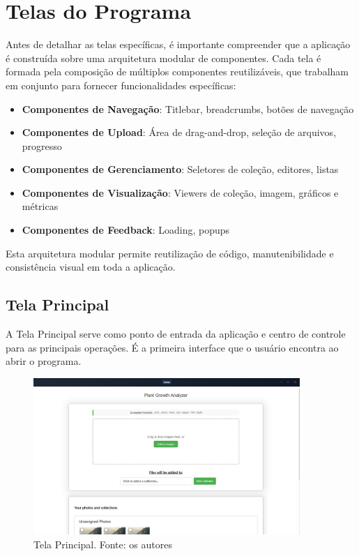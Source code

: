 \chapter{Telas do Programa}

Antes de detalhar as telas específicas, é importante compreender que a aplicação é construída sobre uma arquitetura modular de componentes. Cada tela é formada pela composição de múltiplos componentes reutilizáveis, que trabalham em conjunto para fornecer funcionalidades específicas:

\begin{itemize}
    \item \textbf{Componentes de Navegação}: Titlebar, breadcrumbs, botões de navegação
    \item \textbf{Componentes de Upload}: Área de drag-and-drop, seleção de arquivos, progresso
    \item \textbf{Componentes de Gerenciamento}: Seletores de coleção, editores, listas
    \item \textbf{Componentes de Visualização}: Viewers de coleção, imagem, gráficos e métricas
    \item \textbf{Componentes de Feedback}: Loading, popups
\end{itemize}

Esta arquitetura modular permite reutilização de código, manutenibilidade e consistência visual em toda a aplicação.

\section{Tela Principal}

A Tela Principal serve como ponto de entrada da aplicação e centro de controle para as principais operações. É a primeira interface que o usuário encontra ao abrir o programa.

\begin{figure}[H]
    \centering
    \includegraphics[width=0.9\textwidth]{../figures/hci/home_page.png}
    \caption{Tela Principal. Fonte: os autores}
    \label{fig:home-page}
\end{figure}


